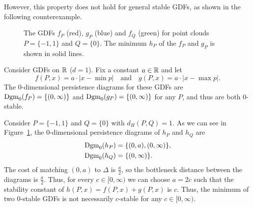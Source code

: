 However, this property does not hold for general stable GDFs, as shown in the
following counterexample.
\begin{example}
    \begin{figure}
        \centering
        \caption{The GDFs $f_P$ (red), $g_P$ (blue) and $f_Q$ (green) for
            point clouds $P = \{-1, 1\}$ and $Q = \{0\}$.
            The minimum $h_P$ of the $f_P$ and $g_P$ is shown in solid lines.}
        \label{fig:min_max_stable_gdfs}
    \end{figure}

    Consider GDFs on $\mathbb{R}$ ($d = 1$).
    Fix a constant $a \in \mathbb{R}$ and let
    \begin{equation}
        f(P, x) = a \cdot |x - \min p| \quad \text{and} \quad g(P, x) = a \cdot |x - \max p|.
    \end{equation}
    The 0-dimensional persistence diagrams for these GDFs are
    $\operatorname{Dgm}_0(f_P) = \{(0, \infty)\}$ and $\operatorname{Dgm}_0(g_P) = \{(0, \infty)\}$ for any
    $P$, and thus are both $0$-stable.

    Consider $P = \{-1, 1\}$ and $Q = \{0\}$ with $d_H(P, Q) = 1$.
    As we can see in Figure~\ref{fig:min_max_stable_gdfs}, the 0-dimensional
    persistence diagrams of $h_P$ and $h_Q$ are
    \begin{align}
        \operatorname{Dgm}_0(h_P) &= \{(0, a), (0, \infty)\}, \\
        \operatorname{Dgm}_0(h_Q) &= \{(0, \infty)\}.
    \end{align}
    The cost of matching $(0, a)$ to $\Delta$ is $\frac{a}{2}$, so the
    bottleneck distance between the diagrams is $\frac{a}{2}$.
    Thus, for every $c \in [0, \infty)$ we can choose $a = 2c$ such that
    the stability constant of $h(P, x) = f(P, x) + g(P, x)$ is $c$.
    Thus, the minimum of two $0$-stable GDFs is not necessarily
    $c$-stable for any $c \in [0, \infty)$.
\end{example}

